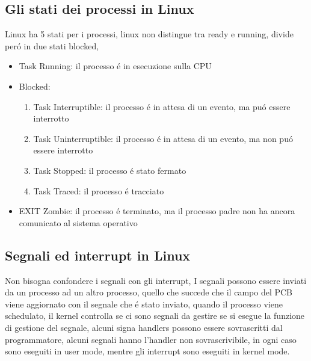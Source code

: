 \subsection{Gli stati dei processi in Linux}
Linux ha 5 stati per i processi, linux non distingue tra ready e running, divide peró in due stati blocked,
\begin{itemize}
    \item Task Running: il processo é in esecuzione sulla CPU
    \item Blocked:
    \begin{enumerate}
        \item Task Interruptible: il processo é in attesa di un evento, ma puó essere interrotto
        \item Task Uninterruptible: il processo é in attesa di un evento, ma non puó essere interrotto
        \item Task Stopped: il processo é stato fermato
        \item Task Traced: il processo é tracciato
    \end{enumerate}
    \item EXIT Zombie: il processo é terminato, ma il processo padre non ha ancora comunicato al sistema operativo
    \end{itemize}
\subsection{Segnali ed interrupt in Linux}
Non bisogna confondere i segnali con gli interrupt, I segnali possono essere inviati da un processo ad un altro processo,
quello che succede che il campo del PCB viene aggiornato con il segnale che é stato inviato, quando il processo
viene schedulato, il kernel controlla se ci sono segnali da gestire se si esegue la funzione di gestione del segnale,
alcuni signa handlers possono essere sovrascritti dal programmatore, alcuni segnali hanno l'handler non sovrascrivibile,
in ogni caso sono eseguiti in user mode, mentre gli interrupt sono eseguiti in kernel mode.
    